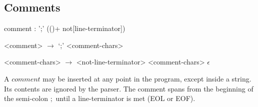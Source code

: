 \documentclass[a4paper]{article}
\begin{document}
\subsection{Comments}
\begin{rail}
	comment : ';' (()+ not[line-terminator])
\end{rail}

\begin{grammar}
	<comment> $\to$ `;' <comment-chars>

	<comment-chars> $\to$ <not-line-terminator> <comment-chars>
		\alt $\epsilon$
\end{grammar}

A $comment$ may be inserted at any point in the program, except inside a string. Its contents are ignored by the parser. The comment spans from the beginning of the semi-colon $;$ until a line-terminator is met (EOL or EOF).
\end{document}
